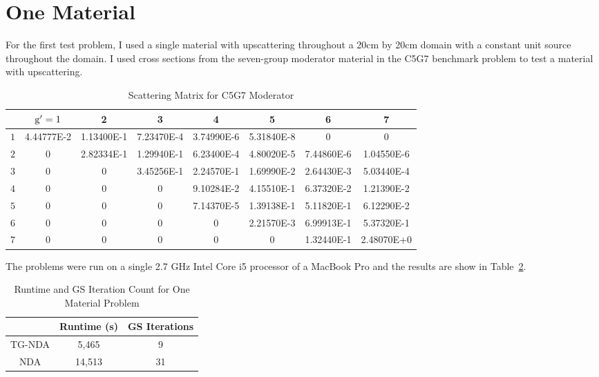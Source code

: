 \section{One Material}
For the first test problem, I used a single material with upscattering throughout a 20cm by 20cm domain with a constant unit source throughout the domain. 
 I used cross sections from the seven-group moderator material in the C5G7 benchmark problem \cite{C5G7} to test a material with upscattering.  
 \begin{table}[!htb]
\small
\centering
\caption{Scattering Matrix for C5G7 Moderator}
    \label{tab:two}
\begin{center}
    \begin{tabular}{|c|c|c|c|c|c|c|c|}
\hline
 & $\mathrm{g}'=1$ & 2 & 3 & 4 & 5 & 6 & 7 \\ 
\hline
 $1$ & 4.44777E-2 &  1.13400E-1 & 7.23470E-4 & 3.74990E-6 & 5.31840E-8     &  0     &    0  \\
\hline
 $2$  & 0       &    2.82334E-1 & 1.29940E-1 & 6.23400E-4  & 4.80020E-5  & 7.44860E-6 &  1.04550E-6 \\
\hline
 $3$  & 0        &      0  &     3.45256E-1 & 2.24570E-1 & 1.69990E-2 & 2.64430E-3 & 5.03440E-4 \\
\hline
 $4$  & 0          &     0    &       0     &  9.10284E-2 & 4.15510E-1 & 6.37320E-2 & 1.21390E-2 \\
\hline
 $5$  & 0        &       0     &      0     & 7.14370E-5 & 1.39138E-1 & 5.11820E-1 & 6.12290E-2 \\
\hline
$6$  & 0        &       0   &    0      &  0     &  2.21570E-3 & 6.99913E-1 &  5.37320E-1 \\
\hline
$7$  & 0       &        0        &   0      &     0      &     0   &    1.32440E-1 & 2.48070E+0 \\
\hline
    \end{tabular}
\end{center}
\end{table}

The problems were run on a single 2.7 GHz Intel Core i5 processor of a MacBook Pro and the results are show in Table~\ref{tab:onemat}.
\begin{table}[!htb]
\centering
\caption{Runtime and GS Iteration Count for One Material Problem}
    \label{tab:onemat}
\begin{center}
    \begin{tabular}{|c|c|c|}
    \hline
    & Runtime (s) & GS Iterations \\
    \hline

    TG-NDA & 5,465 & 9 \\
    NDA & 14,513 & 31 \\
    \hline
    \end{tabular}
\end{center}
\end{table}

